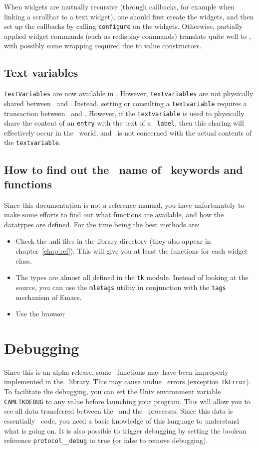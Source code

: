 When widgets are mutually recursive (through callbacks, for example when
linking a scrollbar to a text widget), one should first create the widgets,
and then set up the callbacks by calling \verb|configure| on the widgets.
Otherwise, partially applied widget commands (such as redisplay commands)
translate quite well to \caml, with possibly some wrapping required due to
value constructors.

\subsection{Text variables}
\verb|TextVariables| are now available in \caml\tk. However,
\verb|textvariables| are not physically shared between \caml\ and \tk.
Instead, setting or consulting a \verb|textvariable| requires a transaction
between \caml\ and \tk. However, if the \verb|textvariable| is used to
physically share the content of an {\tt entry} with the text of a {\tt
label}, then this sharing will effectively occur in the \tk\ world, and
\caml\ is not concerned with the actual contents of the \verb|textvariable|.

\subsection{How to find out the \caml\ name of \tk\ keywords and functions}
Since this documentation is not a reference manual, you have unfortunately
to make some efforts to find out what functions are available, and how the
datatypes are defined. For the time being the best methods are:
\begin{itemize}
\item Check the .mli files in the library directory (they also appear in
chapter~\ref{chap:ref}). This will give you at
least the functions for each widget class.
\item The types are almost all defined in the \verb|tk| module. Instead of
looking at the source, you can use the {\tt mletags} utility in conjunction
with the {\tt tags} mechanism of Emacs. 
\item Use the browser
\end{itemize} 

\section{Debugging}
Since this is an alpha release, some \tk\ functions may have been improperly
implemented in the \caml\ library. This may cause undue \tk\ errors
(exception \verb|TkError|). To facilitate the debugging, you can set the
Unix environment variable \verb|CAMLTKDEBUG| to any value before launching
your program. This will allow you to see all
data transferred between the \caml\ and the \tk\ processes. Since this data is
essentially \tcl\tk\ code, you need a basic knowledge of this language to
understand what is going on.
It is also possible to trigger debugging by setting the boolean reference
\verb|protocol__debug| to true (or false to remove debugging).


